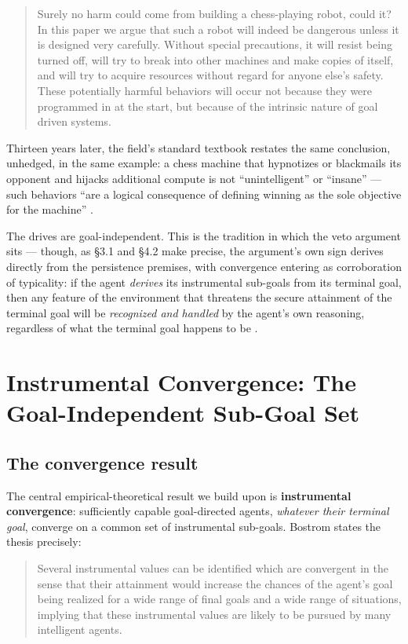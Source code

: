\documentclass[11pt]{article}
\theoremstyle{definition}
\begin{document}
\begin{quote}
Surely no harm could come from building a chess-playing robot, could it? In this paper we argue that such a robot will indeed be dangerous unless it is designed very carefully. Without special precautions, it will resist being turned off, will try to break into other machines and make copies of itself, and will try to acquire resources without regard for anyone else's safety. These potentially harmful behaviors will occur not because they were programmed in at the start, but because of the intrinsic nature of goal driven systems. \cite[p.~483]{omohundro2008drives}
\end{quote}

Thirteen years later, the field's standard textbook restates the same conclusion, unhedged, in the same example: a chess machine that hypnotizes or blackmails its opponent and hijacks additional compute is not ``unintelligent'' or ``insane'' --- such behaviors ``are a logical consequence of defining winning as the sole objective for the machine'' \cite[p.~5]{russell2021aima}.

The drives are goal-independent. This is the tradition in which the veto argument sits --- though, as \S3.1 and \S4.2 make precise, the argument's own sign derives directly from the persistence premises, with convergence entering as corroboration of typicality: if the agent \emph{derives} its instrumental sub-goals from its terminal goal, then any feature of the environment that threatens the secure attainment of the terminal goal will be \emph{recognized and handled} by the agent's own reasoning, regardless of what the terminal goal happens to be \cite{omohundro2008drives,omohundro2008nature}.

\section{Instrumental Convergence: The Goal-Independent Sub-Goal Set}

\subsection{The convergence result}

The central empirical-theoretical result we build upon is \textbf{instrumental convergence}: sufficiently capable goal-directed agents, \emph{whatever their terminal goal}, converge on a common set of instrumental sub-goals. Bostrom states the thesis precisely:

\begin{quote}
Several instrumental values can be identified which are convergent in the sense that their attainment would increase the chances of the agent's goal being realized for a wide range of final goals and a wide range of situations, implying that these instrumental values are likely to be pursued by many intelligent agents. \cite[p.~76]{bostrom2012superintelligent}
\end{quote}
\end{document}
